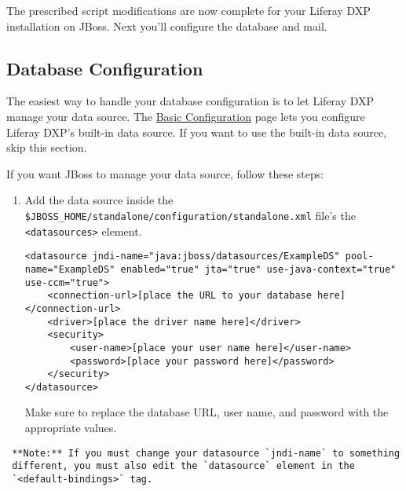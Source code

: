 The prescribed script modifications are now complete for your Liferay
DXP installation on JBoss. Next you'll configure the database and mail.

\subsection{Database Configuration}\label{database-configuration-2}

The easiest way to handle your database configuration is to let Liferay
DXP manage your data source. The
\href{/docs/7-1/deploy/-/knowledge_base/d/installing-liferay\#using-the-setup-wizard}{Basic
Configuration} page lets you configure Liferay DXP's built-in data
source. If you want to use the built-in data source, skip this section.

If you want JBoss to manage your data source, follow these steps:

\begin{enumerate}
\def\labelenumi{\arabic{enumi}.}
\item
  Add the data source inside the
  \texttt{\$JBOSS\_HOME/standalone/configuration/standalone.xml} file's
  the \texttt{\textless{}datasources\textgreater{}} element.

\begin{verbatim}
<datasource jndi-name="java:jboss/datasources/ExampleDS" pool-name="ExampleDS" enabled="true" jta="true" use-java-context="true" use-ccm="true">
    <connection-url>[place the URL to your database here]</connection-url>
    <driver>[place the driver name here]</driver>
    <security>
        <user-name>[place your user name here]</user-name>
        <password>[place your password here]</password>
    </security>
</datasource>
\end{verbatim}

  Make sure to replace the database URL, user name, and password with
  the appropriate values.
\end{enumerate}

\noindent\hrulefill

\begin{verbatim}
 **Note:** If you must change your datasource `jndi-name` to something
 different, you must also edit the `datasource` element in the
 `<default-bindings>` tag.
\end{verbatim}

\noindent\hrulefill

